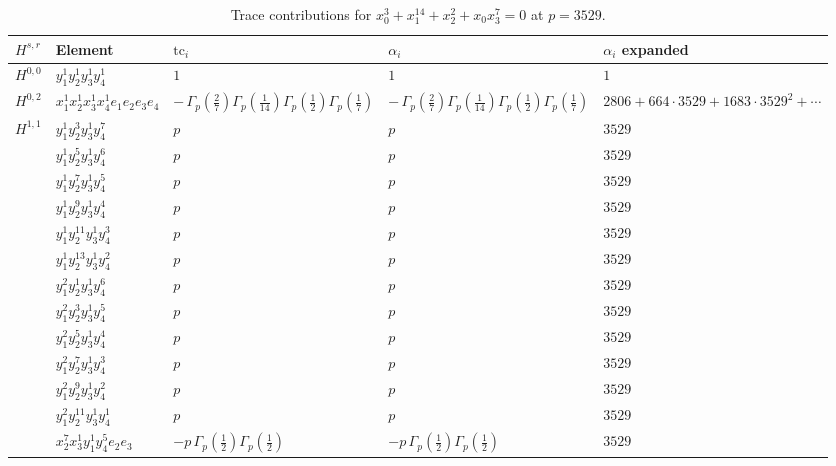 \documentclass[11pt]{article}
\begin{document}
\begin{table}[ht]
\centering
\caption{Trace contributions for $x_0^{3} + x_1^{14} + x_2^{2} + x_0 x_3^{7} = 0$ at $p=3529$.}\label{tab:deformed-83}
\renewcommand{\arraystretch}{1.1}
{\scriptsize
\begin{tabular}{@{}lllll@{}}
\toprule
$H^{s,r}$ & Element & $\mathrm{tc}_i$ & $\alpha_i$ & $\alpha_i$ expanded \\
\midrule
$H^{0,0}$ & $y_{1}^{1} y_{2}^{1} y_{3}^{1} y_{4}^{1}$ & $1$ & $1$ & $1$ \\
\midrule
$H^{0,2}$ & $x_{1}^{1} x_{2}^{1} x_{3}^{1} x_{4}^{1}  e_{1} e_{2} e_{3} e_{4}$ & $- \, \Gamma_p \left( \frac{2}{7} \right) \Gamma_p \left( \frac{1}{14} \right) \Gamma_p \left( \frac{1}{2} \right) \Gamma_p \left( \frac{1}{7} \right)$ & $- \, \Gamma_p \left( \frac{2}{7} \right) \Gamma_p \left( \frac{1}{14} \right) \Gamma_p \left( \frac{1}{2} \right) \Gamma_p \left( \frac{1}{7} \right)$ & $2806{+}664{\cdot}3529{+}1683{\cdot}3529^{2}{+}\cdots$ \\
\midrule
$H^{1,1}$ & $y_{1}^{1} y_{2}^{3} y_{3}^{1} y_{4}^{7}$ & $p \,$ & $p \,$ & $3529$ \\
 & $y_{1}^{1} y_{2}^{5} y_{3}^{1} y_{4}^{6}$ & $p \,$ & $p \,$ & $3529$ \\
 & $y_{1}^{1} y_{2}^{7} y_{3}^{1} y_{4}^{5}$ & $p \,$ & $p \,$ & $3529$ \\
 & $y_{1}^{1} y_{2}^{9} y_{3}^{1} y_{4}^{4}$ & $p \,$ & $p \,$ & $3529$ \\
 & $y_{1}^{1} y_{2}^{11} y_{3}^{1} y_{4}^{3}$ & $p \,$ & $p \,$ & $3529$ \\
 & $y_{1}^{1} y_{2}^{13} y_{3}^{1} y_{4}^{2}$ & $p \,$ & $p \,$ & $3529$ \\
 & $y_{1}^{2} y_{2}^{1} y_{3}^{1} y_{4}^{6}$ & $p \,$ & $p \,$ & $3529$ \\
 & $y_{1}^{2} y_{2}^{3} y_{3}^{1} y_{4}^{5}$ & $p \,$ & $p \,$ & $3529$ \\
 & $y_{1}^{2} y_{2}^{5} y_{3}^{1} y_{4}^{4}$ & $p \,$ & $p \,$ & $3529$ \\
 & $y_{1}^{2} y_{2}^{7} y_{3}^{1} y_{4}^{3}$ & $p \,$ & $p \,$ & $3529$ \\
 & $y_{1}^{2} y_{2}^{9} y_{3}^{1} y_{4}^{2}$ & $p \,$ & $p \,$ & $3529$ \\
 & $y_{1}^{2} y_{2}^{11} y_{3}^{1} y_{4}^{1}$ & $p \,$ & $p \,$ & $3529$ \\
 & $x_{2}^{7} x_{3}^{1} y_{1}^{1} y_{4}^{5} e_{2} e_{3}$ & $- p \, \Gamma_p \left( \frac{1}{2} \right) \Gamma_p \left( \frac{1}{2} \right)$ & $- p \, \Gamma_p \left( \frac{1}{2} \right) \Gamma_p \left( \frac{1}{2} \right)$ & $3529$ \\

\end{tabular}}
\end{table}
\end{document}
